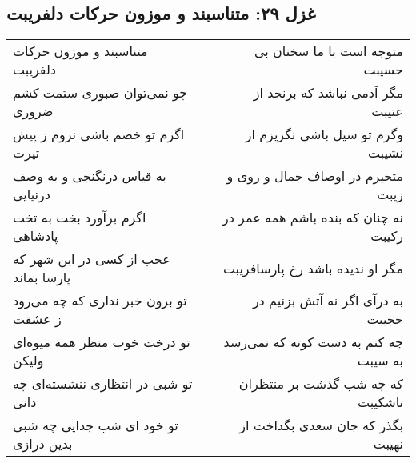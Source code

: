 \begin{center}
\section*{غزل ۲۹: متناسبند و موزون حرکات دلفریبت}
\label{sec:029}
\begin{longtable}{l p{0.5cm} r}
متناسبند و موزون حرکات دلفریبت
&&
متوجه است با ما سخنان بی حسیبت
\\
چو نمی‌توان صبوری ستمت کشم ضروری
&&
مگر آدمی نباشد که برنجد از عتیبت
\\
اگرم تو خصم باشی نروم ز پیش تیرت
&&
وگرم تو سیل باشی نگریزم از نشیبت
\\
به قیاس درنگنجی و به وصف درنیایی
&&
متحیرم در اوصاف جمال و روی و زیبت
\\
اگرم برآورد بخت به تخت پادشاهی
&&
نه چنان که بنده باشم همه عمر در رکیبت
\\
عجب از کسی در این شهر که پارسا بماند
&&
مگر او ندیده باشد رخ پارسافریبت
\\
تو برون خبر نداری که چه می‌رود ز عشقت
&&
به درآی اگر نه آتش بزنیم در حجیبت
\\
تو درخت خوب منظر همه میوه‌ای ولیکن
&&
چه کنم به دست کوته که نمی‌رسد به سیبت
\\
تو شبی در انتظاری ننشسته‌ای چه دانی
&&
که چه شب گذشت بر منتظران ناشکیبت
\\
تو خود ای شب جدایی چه شبی بدین درازی
&&
بگذر که جان سعدی بگداخت از نهیبت
\\
\end{longtable}
\end{center}
